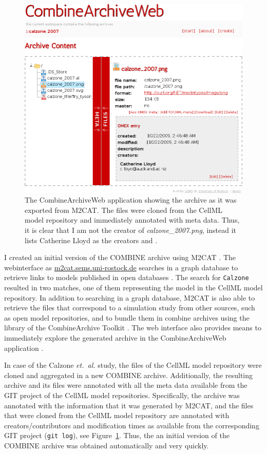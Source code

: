 \begin{figure}
\begin{center}
\includegraphics[width=.8\textwidth]{img/webcat-screenshot-combined.png}
\end{center}
\caption{The CombineArchiveWeb application showing the archive as it was exported from M2CAT. The files were cloned from the CellML model repository and immediately annotated with meta data. Thus, it is clear that I am not the creator of \textit{calzone\_2007.png}, instead it lists Catherine Lloyd as the creators and .}
\label{fig:screen:webcat}
\end{figure}

I created an initial version of the COMBINE archive using M2CAT \cite{m2cat}.
The webinterface as \href{http://m2cat.sems.uni-rostock.de/}{m2cat.sems.uni-rostock.de} searches in a graph database to retrieve links to models published in open databases \cite{masymos}.
The search for \texttt{Calzone} resulted in two matches, one of them representing the model in the CellML model repository.
In addition to searching in a graph database, M2CAT is also able to retrieve the files that correspond to a simulation study from other sources, such as open model repositories, and to bundle them in combine archives using the library of the CombineArchive Toolkit \cite{cat}.
The web interface also provides means to immediately explore the generated archive in the CombineArchiveWeb application \cite{scharm2014}.

In case of the Calzone \emph{et.~al.} study, the files of the CellML model repository were cloned and aggregated in a new COMBINE archive.
Additionally, the resulting archive and its files were annotated with all the meta data available from the GIT project of the CellML model repositories.
Specifically, the archive was annotated with the information that it was generated by M2CAT, and the files that were cloned from the CellML model repository are annotated with creators/contributors and modification times as available from the corresponding GIT project (\texttt{git log}), see Figure~\ref{fig:screen:webcat}. Thus, the an initial version of the COMBINE archive was obtained automatically and very quickly.






